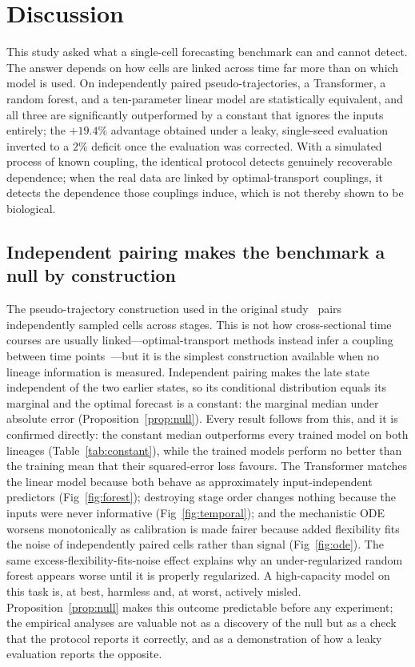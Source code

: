 \documentclass[10pt,letterpaper]{article}
\begin{document}
\section*{Discussion}
\label{sec:discussion}

This study asked what a single-cell forecasting benchmark can and cannot detect. The answer depends on how cells are linked across time far more than on which model is used. On independently paired pseudo-trajectories, a Transformer, a random forest, and a ten-parameter linear model are statistically equivalent, and all three are significantly outperformed by a constant that ignores the inputs entirely; the $+19.4\%$ advantage obtained under a leaky, single-seed evaluation inverted to a $2\%$ deficit once the evaluation was corrected. With a simulated process of known coupling, the identical protocol detects genuinely recoverable dependence; when the real data are linked by optimal-transport couplings, it detects the dependence those couplings induce, which is not thereby shown to be biological.

\subsection*{Independent pairing makes the benchmark a null by construction}
The pseudo-trajectory construction used in the original study~\cite{kanu2026transformer} pairs independently sampled cells across stages. This is not how cross-sectional time courses are usually linked---optimal-transport methods instead infer a coupling between time points~\cite{schiebinger2019optimal}---but it is the simplest construction available when no lineage information is measured. Independent pairing makes the late state independent of the two earlier states, so its conditional distribution equals its marginal and the optimal forecast is a constant: the marginal median under absolute error (Proposition~\ref{prop:null}). Every result follows from this, and it is confirmed directly: the constant median outperforms every trained model on both lineages (Table~\ref{tab:constant}), while the trained models perform no better than the training mean that their squared-error loss favours. The Transformer matches the linear model because both behave as approximately input-independent predictors (Fig~\ref{fig:forest}); destroying stage order changes nothing because the inputs were never informative (Fig~\ref{fig:temporal}); and the mechanistic ODE worsens monotonically as calibration is made fairer because added flexibility fits the noise of independently paired cells rather than signal (Fig~\ref{fig:ode}). The same excess-flexibility-fits-noise effect explains why an under-regularized random forest appears worse until it is properly regularized. A high-capacity model on this task is, at best, harmless and, at worst, actively misled. Proposition~\ref{prop:null} makes this outcome predictable before any experiment; the empirical analyses are valuable not as a discovery of the null but as a check that the protocol reports it correctly, and as a demonstration of how a leaky evaluation reports the opposite.
\end{document}
